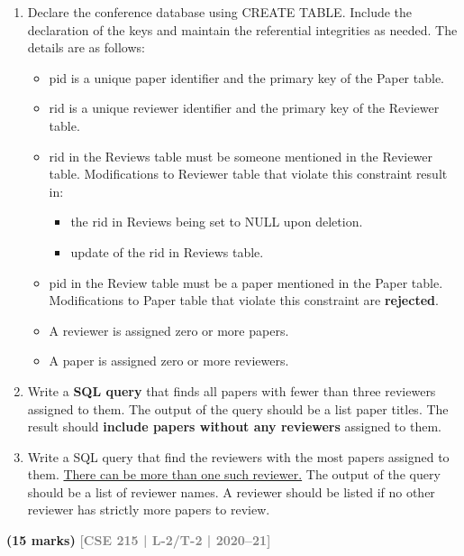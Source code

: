\documentclass[12pt]{article}
\newcommand{\yr}[1]{\hfill\textcolor{gray}{\small\textbf{[#1]}}}
\newcommand{\mk}[1]{\textcolor{orange!70!black}{\small\textbf{(#1 marks)}}}
\begin{document}
\begin{enumerate}
\begin{enumerate}[label=\roman*.]
    \item Declare the conference database using CREATE TABLE. Include the declaration of the keys and maintain the referential integrities as needed. The details are as follows:
    \begin{itemize}
        \item pid is a unique paper identifier and the primary key of the Paper table.
        \item rid is a unique reviewer identifier and the primary key of the Reviewer table.
        \item rid in the Reviews table must be someone mentioned in the Reviewer table. Modifications to Reviewer table that violate this constraint result in:
        \begin{itemize}
            \item[*] the rid in Reviews being set to NULL upon deletion.
            \item[*] update of the rid in Reviews table.
        \end{itemize}
        \item pid in the Review table must be a paper mentioned in the Paper table. Modifications to Paper table that violate this constraint are \textbf{rejected}.
        \item A reviewer is assigned zero or more papers.
        \item A paper is assigned zero or more reviewers.
    \end{itemize}
    
    \item Write a \textbf{SQL query} that finds all papers with fewer than three reviewers assigned to them. The output of the query should be a list paper titles. The result should \textbf{include papers without any reviewers} assigned to them.
    
    \item Write a SQL query that find the reviewers with the most papers assigned to them. \underline{There can be more than one such reviewer.} The output of the query should be a list of reviewer names. A reviewer should be listed if no other reviewer has strictly more papers to review.
\end{enumerate}
\mk{15} \yr{CSE 215 | L-2/T-2 | 2020--21}



\end{enumerate}
\end{document}
